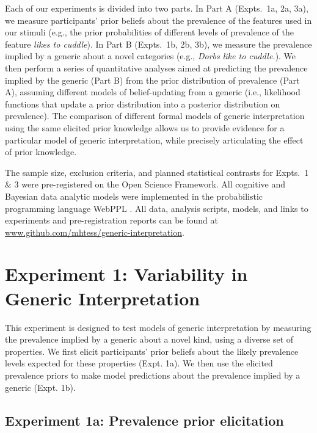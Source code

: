 \documentclass[floatsintext,doc]{apa6}
\begin{document}
Each of our experiments is divided into two parts. 
In Part A (Expts.~1a, 2a, 3a), we measure participants' prior beliefs about the prevalence of the features used in our stimuli (e.g., the prior probabilities of different levels of prevalence of the feature \emph{likes to cuddle}). %
In Part B (Expts.~1b, 2b, 3b), we measure the prevalence implied by a generic about a novel categories (e.g., \emph{Dorbs like to cuddle.}). 
We then perform a series of quantitative analyses aimed at predicting the prevalence implied by the generic (Part B) from the prior distribution of prevalence (Part A), assuming different models of belief-updating from a generic (i.e., likelihood functions that update a prior distribution into a posterior distribution on prevalence). 
The comparison of different formal models of generic interpretation using the same elicited prior knowledge allows us to provide evidence for a particular model of generic interpretation, while precisely articulating the effect of prior knowledge. 

The sample size, exclusion criteria, and planned statistical contrasts for Expts.~1 \& 3 were pre-registered on the Open Science Framework.
All cognitive and Bayesian data analytic models were implemented in the probabilistic programming language WebPPL \cite{dippl}. 
All data, analysis scripts, models, and links to experiments and pre-registration reports can be found at \url{www.github.com/mhtess/generic-interpretation}.

\hypertarget{experiment-1}{%
\section{Experiment 1: Variability in Generic Interpretation}\label{experiment-1}}

This experiment is designed to test models of generic interpretation by measuring the prevalence implied by a generic about a novel kind, using a diverse set of properties.
We first elicit participants' prior beliefs about the likely prevalence levels expected for these properties (Expt. 1a).
We then use the elicited prevalence priors to make model predictions about the prevalence implied by a generic (Expt. 1b).

\hypertarget{experiment-1a-prevalence-prior-elicitation}{%
\subsection{Experiment 1a: Prevalence prior elicitation}\label{experiment-1a-prevalence-prior-elicitation}}
\end{document}
